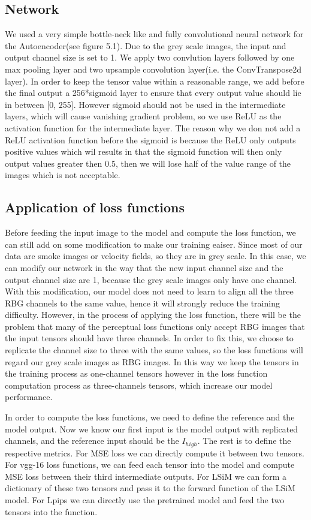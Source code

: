 \documentclass[a4paper,12pt,twoside]{report}
\begin{document}
\subsection{Network}
We used a very simple bottle-neck like and fully convolutional neural network for the Autoencoder(see figure 5.1). Due to the grey scale images, the input and output channel size is set to 1. We apply two convlution layers followed by one max pooling layer and two upsample convolution layer(i.e. the ConvTranspose2d layer). In order to keep the tensor value within a reasonable range, we add before the final output a 256*sigmoid layer to ensure that every output value should lie in between [0, 255]. However sigmoid should not be used in the intermediate layers, which will cause vanishing gradient problem, so we use ReLU as the activation function for the intermediate layer. The reason why we don not add a ReLU activation function before the sigmoid is because the ReLU only outputs positive values which wil results in that the sigmoid function will then only output values greater then 0.5, then we will lose half of the value range of the images which is not acceptable.
\subsection{Application of loss functions}
Before feeding the input image to the model and compute the loss function, we can still add on some modification to make our training eaiser. Since most of our data are smoke images or velocity fields, so they are in grey scale. In this case, we can modify our network in the way that the new input channel size and the output channel size are 1, because the grey scale images only have one channel. With this modification, our model does not need to learn to align all the three RBG channels to the same value, hence it will strongly reduce the training difficulty. However, in the process of applying the loss function, there will be the problem that many of the perceptual loss functions only accept RBG images that the input tensors should have three channels. In order to fix this, we choose to replicate the channel size to three with the same values, so the loss functions will regard our grey scale images as RBG images. In this way we keep the tensors in the training process as one-channel tensors however in the loss function computation process as three-channels tensors, which increase our model performance.

In order to compute the loss functions, we need to define the reference and the model output. Now we know our first input is the model output with replicated channels, and the reference input should be the $I_{high}$. The rest is to define the respective metrics. For MSE loss we can directly compute it between two tensors. For vgg-16 loss functions, we can feed each tensor into the model and compute MSE loss between their third intermediate outputs. For LSiM we can form a dictionary of these two tensors and pass it to the forward function of the LSiM model. For Lpips we can directly use the pretrained model and feed the two tensors into the function.
\end{document}

